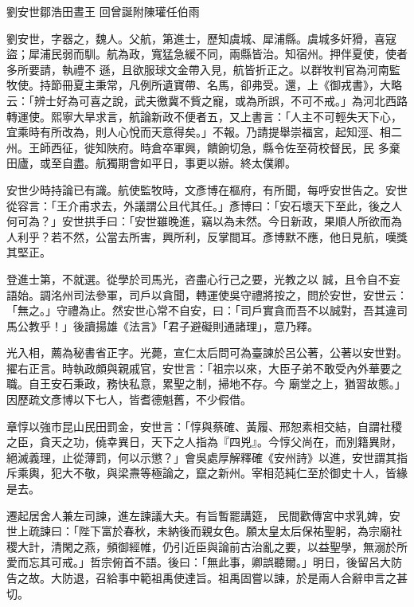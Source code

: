 
\begin{pinyinscope}

 劉安世鄒浩田晝王
 回曾誕附陳瓘任伯雨



 劉安世，字器之，魏人。父航，第進士，歷知虞城、犀浦縣。虞城多奸猾，喜寇盜；犀浦民弱而馴。航為政，寬猛急緩不同，兩縣皆治。知宿州。押伴夏使，使者多所要請，執禮不
 遜，且欲服球文金帶入見，航皆折正之。以群牧判官為河南監牧使。持節冊夏主秉常，凡例所遺寶帶、名馬，卻弗受。還，上《御戎書》，大略云：「辨士好為可喜之說，武夫徼冀不貲之寵，或為所誤，不可不戒。」為河北西路轉運使。熙寧大旱求言，航論新政不便者五，又上書言：「人主不可輕失天下心，宜乘時有所改為，則人心悅而天意得矣。」不報。乃請提舉崇福宮，起知涇、相二州。王師西征，徙知陜府。時倉卒軍興，饋餉切急，縣令佐至荷校督民，民
 多棄田廬，或至自盡。航獨期會如平日，事更以辦。終太僕卿。



 安世少時持論已有識。航使監牧時，文彥博在樞府，有所聞，每呼安世告之。安世從容言：「王介甫求去，外議謂公且代其任。」彥博曰：「安石壞天下至此，後之人何可為？」安世拱手曰：「安世雖晚進，竊以為未然。今日新政，果順人所欲而為人利乎？若不然，公當去所害，興所利，反掌間耳。彥博默不應，他日見航，嘆獎其堅正。



 登進士第，不就選。從學於司馬光，咨盡心行己之要，光教之以
 誠，且令自不妄語始。調洺州司法參軍，司戶以貪聞，轉運使吳守禮將按之，問於安世，安世云：「無之。」守禮為止。然安世心常不自安，曰：「司戶實貪而吾不以誠對，吾其違司馬公教乎！」後讀揚雄《法言》「君子避礙則通諸理」，意乃釋。



 光入相，薦為秘書省正字。光薨，宣仁太后問可為臺諫於呂公著，公著以安世對。擢右正言。時執政頗與親戚官，安世言：「祖宗以來，大臣子弟不敢受內外華要之職。自王安石秉政，務快私意，累聖之制，掃地不存。今
 廟堂之上，猶習故態。」因歷疏文彥博以下七人，皆耆德魁舊，不少假借。



 章惇以強市昆山民田罰金，安世言：「惇與蔡確、黃履、邢恕素相交結，自謂社稷之臣，貪天之功，僥幸異日，天下之人指為『四兇』。今惇父尚在，而別籍異財，絕滅義理，止從薄罰，何以示懲？」會吳處厚解釋確《安州詩》以進，安世謂其指斥乘輿，犯大不敬，與梁燾等極論之，竄之新州。宰相范純仁至於御史十人，皆緣是去。



 遷起居舍人兼左司諫，進左諫議大夫。有旨暫罷講筵，
 民間歡傳宮中求乳婢，安世上疏諫曰：「陛下富於春秋，未納後而親女色。願太皇太后保祐聖躬，為宗廟社稷大計，清閑之燕，頻御經帷，仍引近臣與論前古治亂之要，以益聖學，無溺於所愛而忘其可戒。」哲宗俯首不語。後曰：「無此事，卿誤聽爾。」明日，後留呂大防告之故。大防退，召給事中範祖禹使達旨。祖禹固嘗以諫，於是兩人合辭申言之甚切。




\end{pinyinscope}
